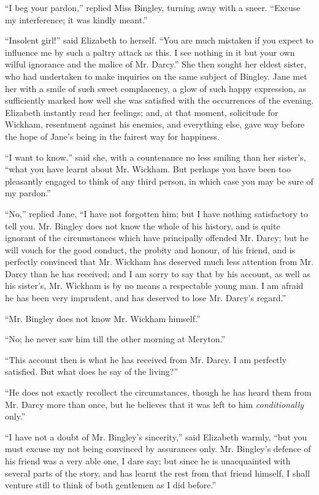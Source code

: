 \documentclass[12pt]{book}
\begin{document}
``I beg your pardon,'' replied Miss Bingley, turning away with a sneer. ``Excuse my interference; it was kindly meant.''

``Insolent girl!'' said Elizabeth to herself. ``You are much mistaken if you expect to influence me by such a paltry attack as this. I see nothing in it but your own wilful ignorance and the malice of Mr. Darcy.'' She then sought her eldest sister, who had undertaken to make inquiries on the same subject of Bingley. Jane met her with a smile of such sweet complacency, a glow of such happy expression, as sufficiently marked how well she was satisfied with the occurrences of the evening. Elizabeth instantly read her feelings; and, at that moment, solicitude for Wickham, resentment against his enemies, and everything else, gave way before the hope of Jane's being in the fairest way for happiness.

``I want to know,'' said she, with a countenance no less smiling than her sister's, ``what you have learnt about Mr. Wickham. But perhaps you have been too pleasantly engaged to think of any third person, in which case you may be sure of my pardon.''

``No,'' replied Jane, ``I have not forgotten him; but I have nothing satisfactory to tell you. Mr. Bingley does not know the whole of his history, and is quite ignorant of the circumstances which have principally offended Mr. Darcy; but he will vouch for the good conduct, the probity and honour, of his friend, and is perfectly convinced that Mr. Wickham has deserved much less attention from Mr. Darcy than he has received; and I am sorry to say that by his account, as well as his sister's, Mr. Wickham is by no means a respectable young man. I am afraid he has been very imprudent, and has deserved to lose Mr. Darcy's regard.''

``Mr. Bingley does not know Mr. Wickham himself.''

``No; he never saw him till the other morning at Meryton.''

``This account then is what he has received from Mr. Darcy. I am perfectly satisfied. But what does he say of the living?''

``He does not exactly recollect the circumstances, though he has heard them from Mr. Darcy more than once, but he believes that it was left to him \textit{conditionally} only.''

``I have not a doubt of Mr. Bingley's sincerity,'' said Elizabeth warmly, ``but you must excuse my not being convinced by assurances only. Mr. Bingley's defence of his friend was a very able one, I dare say; but since he is unacquainted with several parts of the story, and has learnt the rest from that friend himself, I shall venture still to think of both gentlemen as I did before.''
\end{document}
